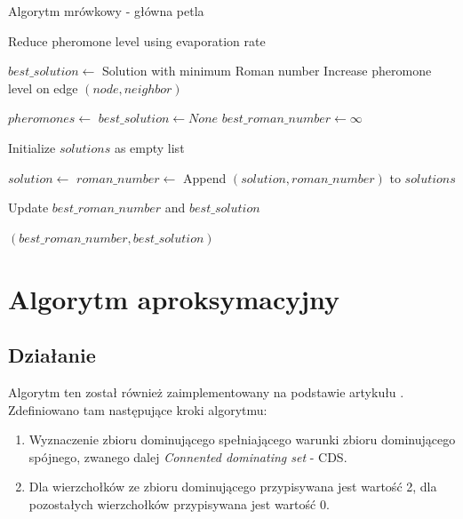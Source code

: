 \begin{algorithm}
    \caption*{Algorytm mrówkowy - główna petla}
    \begin{algorithmic}[1]
    
            \State Reduce pheromone level using evaporation rate
        \EndFor

        \State $best\_solution \gets$ Solution with minimum Roman number
                \State Increase pheromone level on edge $(node, neighbor)$
            \EndFor
        \EndFor
    \EndFunction

        \State $pheromones \gets$ 
        \State $best\_solution \gets None$
        \State $best\_roman\_number \gets \infty$

            \State Initialize $solutions$ as empty list

                \State $solution \gets$ 
                \State $roman\_number \gets$ 
                \State Append $(solution, roman\_number)$ to $solutions$

                    \State Update $best\_roman\_number$ and $best\_solution$
                \EndIf
            \EndFor

            \State {}
        \EndFor

        \State \Return $(best\_roman\_number, best\_solution)$
    \EndFunction
    
    \end{algorithmic}
\end{algorithm}

\FloatBarrier
\section{Algorytm aproksymacyjny}
\subsection{Działanie}

Algorytm ten został również zaimplementowany na podstawie artykułu \cite{ILP}. Zdefiniowano tam następujące kroki algorytmu:
\begin{enumerate}
    \item Wyznaczenie zbioru dominującego spełniającego warunki zbioru dominującego spójnego, zwanego dalej \textit{Connented dominating set} - CDS.
    \item Dla wierzchołków ze zbioru dominującego przypisywana jest wartość 2, dla pozostałych wierzchołków przypisywana jest wartość 0.
\end{enumerate}

